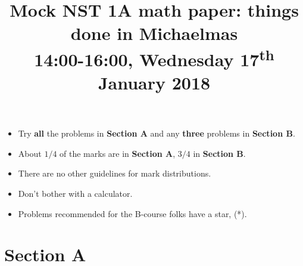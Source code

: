 \documentclass[10pt]{iopart}
\begin{document}
\title{Mock NST 1A math paper: things done in Michaelmas\\ \vspace{1cm} \large 14:00-16:00, Wednesday 17\textsuperscript{th} January 2018}
\vspace{2cm}
\begin{itemize}
\item	Try \textbf{all} the problems in \textbf{Section A} and any \textbf{three} problems in \textbf{Section B}. 
\item	About $1/4$ of the marks are in \textbf{Section A}, $3/4$ in \textbf{Section B}. 
\item	There are no other guidelines for mark distributions.
\item	Don't bother with a calculator.
\item	Problems recommended for the B-course folks have a star, (*).
\end{itemize}
\maketitle
\section*{Section A}\label{sa}
\end{document}
